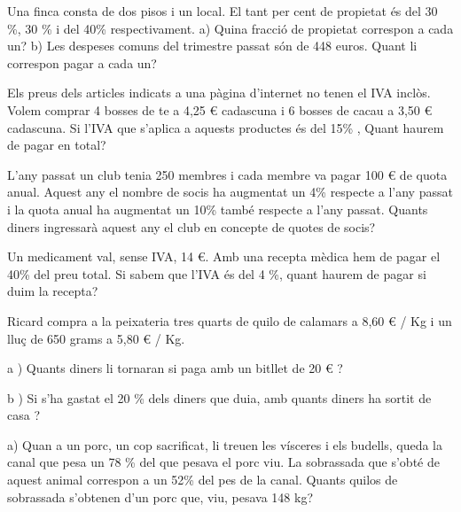 \begin{mylist}
\exer
  Una finca consta de dos pisos i un local. El tant per cent de
  propietat és del 30 \%, 30 \% i del 40\% respectivament. a) Quina
  fracció de propietat correspon a cada un? b) Les despeses comuns del
  trimestre passat són de 448 euros. Quant li correspon pagar a cada un?
  		
\exer
  Els preus dels articles indicats a una pàgina d'internet no tenen el
  IVA inclòs. Volem comprar 4 bosses de te a 4,25 \euro{} cadascuna i 6
  bosses de cacau a 3,50 \euro{} cadascuna. Si l'IVA que s'aplica a
  aquests productes és del 15\% , Quant haurem de pagar en total?
  
  
\exer
  L'any passat un club tenia 250 membres i cada membre va pagar 100
  \euro{} de quota anual. Aquest any el nombre de socis ha augmentat un
  4\% respecte a l'any passat i la quota anual ha augmentat un 10\%
  també respecte a l'any passat. Quants diners ingressarà aquest any el
  club en concepte de quotes de socis?
  
  
\exer
  Un medicament val, sense IVA, 14 \euro{}. Amb una recepta mèdica hem
  de pagar el 40\% del preu total. Si sabem que l'IVA és del 4 \%, quant
  haurem de pagar si duim la recepta?
  
    
\exer
  Ricard compra a la peixateria tres quarts de quilo de calamars a 8,60
  \euro{} / Kg i un lluç de 650 grams a 5,80 \euro{} / Kg.

  a ) Quants diners li tornaran si paga amb un bitllet de 20 \euro{} ?

  b ) Si s'ha gastat el 20 \% dels diners que duia, amb quants diners
  ha sortit de casa ?
  
    \answers{[$0.75\cdot 8.60 + 0.650\cdot 5.80 = 10.22$ li ha costat; li tornaran $9.78$ \euro{},  
    	Tenia $0.2\,x = 10.22 \quad \rightarrow \quad x=51.10$ \euro{}]}
    
\exer
  a) Quan a un porc, un cop sacrificat, li treuen les vísceres i els
  budells, queda la canal que pesa un 78 \% del que pesava el porc viu.
  La sobrassada que s'obté de aquest animal correspon a un 52\% del pes
  de la canal. Quants quilos de sobrassada s'obtenen d'un porc que, viu,
  pesava 148 kg?


\end{mylist}
